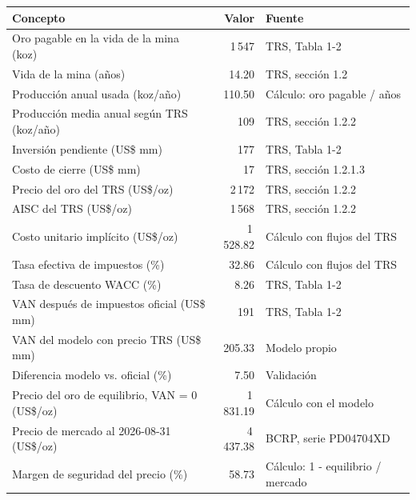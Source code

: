 \begin{tabularx}{\linewidth}{>{\raggedright\arraybackslash}Xr>{\raggedright\arraybackslash}X}
\toprule
Concepto & Valor & Fuente \\
\midrule
Oro pagable en la vida de la mina (koz) & 1\,547 & TRS, Tabla 1-2 \\
Vida de la mina (años) & 14.20 & TRS, sección 1.2 \\
Producción anual usada (koz/año) & 110.50 & Cálculo: oro pagable / años \\
Producción media anual según TRS (koz/año) & 109 & TRS, sección 1.2.2 \\
Inversión pendiente (US\$ mm) & 177 & TRS, Tabla 1-2 \\
Costo de cierre (US\$ mm) & 17 & TRS, sección 1.2.1.3 \\
Precio del oro del TRS (US\$/oz) & 2\,172 & TRS, sección 1.2.2 \\
AISC del TRS (US\$/oz) & 1\,568 & TRS, sección 1.2.2 \\
Costo unitario implícito (US\$/oz) & 1\,528.82 & Cálculo con flujos del TRS \\
Tasa efectiva de impuestos (\%) & 32.86 & Cálculo con flujos del TRS \\
Tasa de descuento WACC (\%) & 8.26 & TRS, Tabla 1-2 \\
VAN después de impuestos oficial (US\$ mm) & 191 & TRS, Tabla 1-2 \\
VAN del modelo con precio TRS (US\$ mm) & 205.33 & Modelo propio \\
Diferencia modelo vs. oficial (\%) & 7.50 & Validación \\
Precio del oro de equilibrio, VAN = 0 (US\$/oz) & 1\,831.19 & Cálculo con el modelo \\
Precio de mercado al 2026-08-31 (US\$/oz) & 4\,437.38 & BCRP, serie PD04704XD \\
Margen de seguridad del precio (\%) & 58.73 & Cálculo: 1 - equilibrio / mercado \\
\bottomrule
\end{tabularx}
